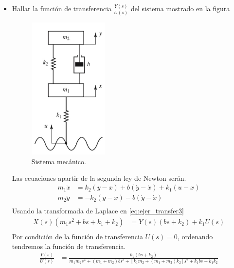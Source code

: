 \documentclass[12pt]{article}
\begin{document}
\begin{itemize}
    \item  Hallar la función de transferencia $\frac{Y(s)}{U(s)}$ del sistema mostrado en la figura
    \begin{figure}[h]
        \centering
            \includegraphics[width=4cm]{IMAGENES/transfer3}
            \caption{Sistema mecánico.}
    \end{figure}
    Las ecuaciones apartir de la segunda ley de Newton serán.
    \begin{equation}
        \begin{split}
        m_{1}\ddot{x}&=k_{2}(y-x)+b(\dot{y}-\dot{x})+k_{1}(u-x)\\
        m_{2}\ddot{y}&=-k_{2}(y-x)-b(\dot{y}-\dot{x})\\
        \end{split}
    \label{eq:ejer_transfer3}
    \end{equation}
    Usando la transformada de Laplace en \ref{eq:ejer_transfer3}
    \begin{equation}
        \begin{split}
            X(s)(m_{1}s^2+bs+k_{1}+k_{2})&=Y(s)(bs+k_{2})+k_{1}U(s)\\
        \end{split}
        \label{eq:ejer_transfer31}
    \end{equation}
    Por condición de la función de transferencia $U(s)=0$, ordenando tendremos la función de transferencia.
    \begin{equation}
        \begin{split}
        \frac{Y(s)}{U(s)}&=\frac{k_{1}(bs+k_{2})}{m_{1}m_{2}s^4+(m_{1}+m_{2})bs^3+[k_{1}m_{2}+(m_{1}+m_{2})k_{2}]s^2+k_{1}bs+k_{1}k_{2}}\\
        \end{split}
    \label{eq:ejer_transfer32}
    \end{equation}


\end{itemize}
\end{document}

